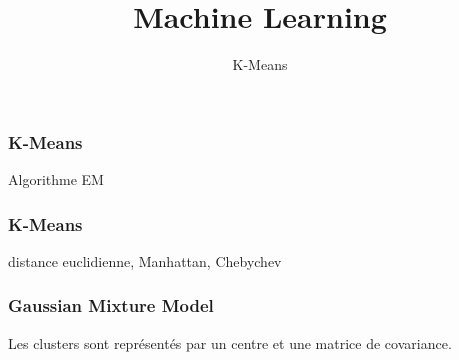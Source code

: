 \documentclass{formation}
\title{Machine Learning}
\subtitle{K-Means}
\begin{document}
\maketitle

\begin{frame}
  \frametitle{K-Means}
  Algorithme EM
\end{frame}

\begin{frame}
  \frametitle{K-Means}
  distance euclidienne, Manhattan, Chebychev
\end{frame}

\begin{frame}
  \frametitle{Gaussian Mixture Model}
  Les clusters sont représentés par un centre et une matrice de covariance.
\end{frame}
\end{document}
